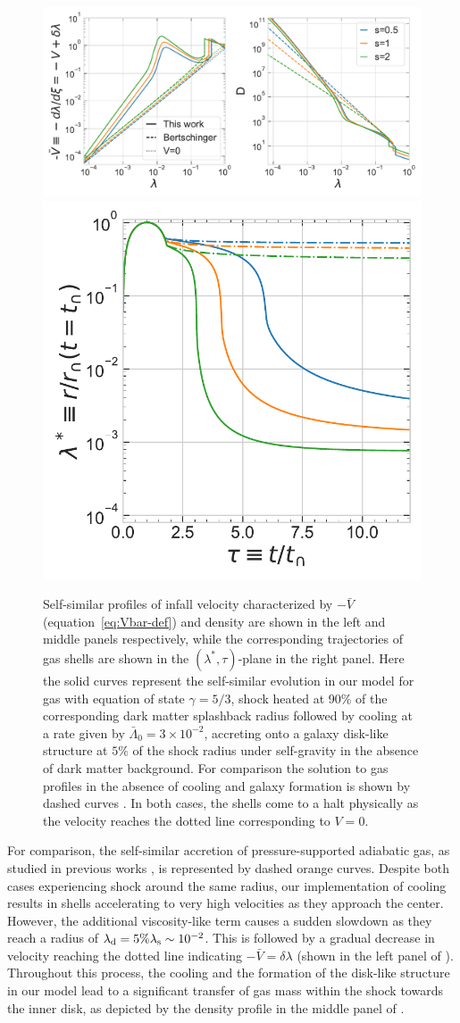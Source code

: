 \begin{figure}[htbp]
\centering
\includegraphics[width=0.665\linewidth]{plots/Eds-gaso_profiles_shocked_vary-s.pdf}
\includegraphics[width=0.325\linewidth]{plots/Eds-gaso_trajectory_shocked_vary-s.pdf}
\caption{%
Self-similar profiles of infall velocity characterized by $-\bar{V}$ (equation~\ref{eq:Vbar-def}) and density are shown in the left and middle panels respectively, while the corresponding trajectories of gas shells are shown in the $(\lambda^*,\tau)$-plane in the right panel. Here the solid curves represent the self-similar evolution in our model for gas with equation of state $\gamma=5/3$, shock heated at 90\% of the corresponding dark matter splashback radius followed by cooling at a rate given by $\bar{\Lambda}_0=3 \times 10^{-2}$, accreting onto a galaxy disk-like structure at $5\%$ of the shock radius under self-gravity in the absence of dark matter background. For comparison the solution to gas profiles in the absence of cooling and galaxy formation is shown by dashed curves \cite{1985Bertschinger}. 
In both cases, the shells come to a halt physically as the velocity reaches the dotted line corresponding to $V=0$.}
\label{fig:gaso-vary-s}
\end{figure}

For comparison, the self-similar accretion of pressure-supported adiabatic gas, as studied in previous works \cite{1984FillmoreGoldreich,1985Bertschinger,2016ShiICM}, is represented by dashed orange curves. Despite both cases experiencing shock around the same radius, our implementation of cooling results in shells accelerating to very high velocities as they approach the center. However, the additional viscosity-like term causes a sudden slowdown as they reach a radius of $\lambda_{\rm d}=5\% \lambda_{\rm s} \sim 10^{-2}$. This is followed by a gradual decrease in velocity reaching the dotted line indicating $-\bar{V}=\delta \lambda$ (shown in the left panel of ). 
Throughout this process, the cooling and the formation of the disk-like structure in our model lead to a significant transfer of gas mass within the shock towards the inner disk, as depicted by the density profile in the middle panel of .

